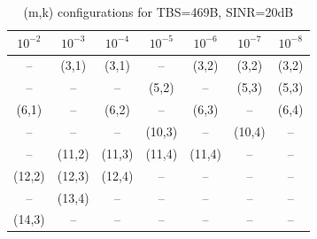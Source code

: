 \begin{table}[ht]
\centering
\caption{(m,k) configurations for TBS=469B, SINR=20dB}
\label{tab:conf_{469B_20dB}}
\begin{tabular}{ccccccc}
\hline
$10^{-2}$ & $10^{-3}$ & $10^{-4}$ & $10^{-5}$ & $10^{-6}$ & $10^{-7}$ & $10^{-8}$ \\ \hline
-- & (3,1) & (3,1) & -- & (3,2) & (3,2) & (3,2) \\
-- & -- & -- & (5,2) & -- & (5,3) & (5,3) \\
(6,1) & -- & (6,2) & -- & (6,3) & -- & (6,4) \\
-- & -- & -- & (10,3) & -- & (10,4) & -- \\
-- & (11,2) & (11,3) & (11,4) & (11,4) & -- & -- \\
(12,2) & (12,3) & (12,4) & -- & -- & -- & -- \\
-- & (13,4) & -- & -- & -- & -- & -- \\
(14,3) & -- & -- & -- & -- & -- & -- \\
\hline
\end{tabular}
\end{table}